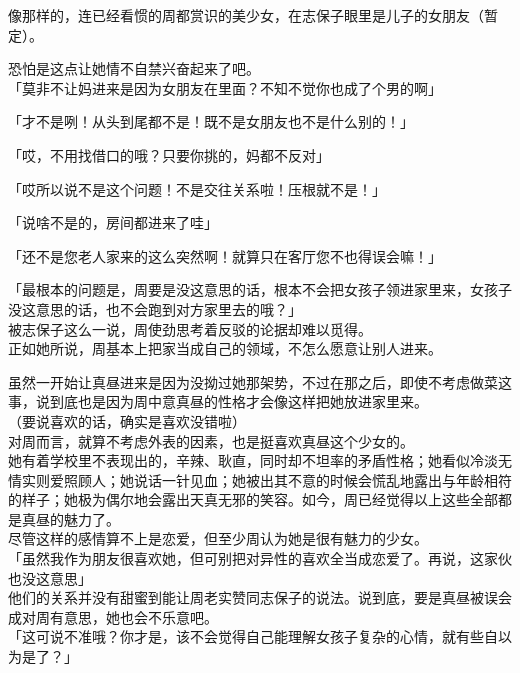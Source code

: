 像那样的，连已经看惯的周都赏识的美少女，在志保子眼里是儿子的女朋友（暂定）。

恐怕是这点让她情不自禁兴奋起来了吧。\\

「莫非不让妈进来是因为女朋友在里面？不知不觉你也成了个男的啊」

「才不是咧！从头到尾都不是！既不是女朋友也不是什么别的！」

「哎，不用找借口的哦？只要你挑的，妈都不反对」

「哎所以说不是这个问题！不是交往关系啦！压根就不是！」

「说啥不是的，房间都进来了哇」

「还不是您老人家来的这么突然啊！就算只在客厅您不也得误会嘛！」

「最根本的问题是，周要是没这意思的话，根本不会把女孩子领进家里来，女孩子没这意思的话，也不会跑到对方家里去的哦？」\\

被志保子这么一说，周使劲思考着反驳的论据却难以觅得。\\

正如她所说，周基本上把家当成自己的领域，不怎么愿意让别人进来。

虽然一开始让真昼进来是因为没拗过她那架势，不过在那之后，即使不考虑做菜这事，说到底也是因为周中意真昼的性格才会像这样把她放进家里来。\\

（要说喜欢的话，确实是喜欢没错啦）\\

对周而言，就算不考虑外表的因素，也是挺喜欢真昼这个少女的。\\

她有着学校里不表现出的，辛辣、耿直，同时却不坦率的矛盾性格；她看似冷淡无情实则爱照顾人；她说话一针见血；她被出其不意的时候会慌乱地露出与年龄相符的样子；她极为偶尔地会露出天真无邪的笑容。如今，周已经觉得以上这些全部都是真昼的魅力了。\\

尽管这样的感情算不上是恋爱，但至少周认为她是很有魅力的少女。\\

「虽然我作为朋友很喜欢她，但可别把对异性的喜欢全当成恋爱了。再说，这家伙也没这意思」\\

他们的关系并没有甜蜜到能让周老实赞同志保子的说法。说到底，要是真昼被误会成对周有意思，她也会不乐意吧。\\

「这可说不准哦？你才是，该不会觉得自己能理解女孩子复杂的心情，就有些自以为是了？」

